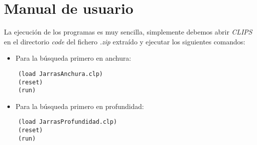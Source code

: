 \documentclass[11pt,a4paper,final]{article}
\begin{document}
\newpage

\section{Manual de usuario}
La ejecución de los programas es muy sencilla, simplemente debemos abrir \emph{CLIPS} en el directorio \emph{code} del fichero \emph{.zip} extraído y ejecutar los siguientes comandos:
\begin{itemize}
	\item Para la búsqueda primero en anchura:
\end{itemize}
\begin{lstlisting}
	(load JarrasAnchura.clp)
	(reset)
	(run)
\end{lstlisting}
\begin{itemize}
	\item Para la búsqueda primero en profundidad:
\end{itemize}
\begin{lstlisting}
	(load JarrasProfundidad.clp)
	(reset)
	(run)
\end{lstlisting}
\end{document}
